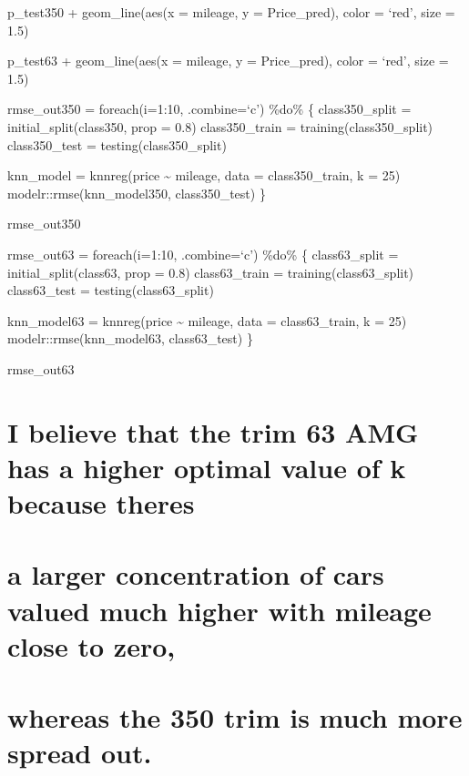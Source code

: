 \documentclass[
]{article}
\begin{document}
p\_test350 + geom\_line(aes(x = mileage, y = Price\_pred), color =
`red', size = 1.5)

p\_test63 + geom\_line(aes(x = mileage, y = Price\_pred), color = `red',
size = 1.5)

rmse\_out350 = foreach(i=1:10, .combine=`c') \%do\% \{ class350\_split =
initial\_split(class350, prop = 0.8) class350\_train =
training(class350\_split) class350\_test = testing(class350\_split)

knn\_model = knnreg(price \textasciitilde{} mileage, data =
class350\_train, k = 25) modelr::rmse(knn\_model350, class350\_test) \}

rmse\_out350

rmse\_out63 = foreach(i=1:10, .combine=`c') \%do\% \{ class63\_split =
initial\_split(class63, prop = 0.8) class63\_train =
training(class63\_split) class63\_test = testing(class63\_split)

knn\_model63 = knnreg(price \textasciitilde{} mileage, data =
class63\_train, k = 25) modelr::rmse(knn\_model63, class63\_test) \}

rmse\_out63

\hypertarget{i-believe-that-the-trim-63-amg-has-a-higher-optimal-value-of-k-because-theres}{%
\section{I believe that the trim 63 AMG has a higher optimal value of k
because
theres}\label{i-believe-that-the-trim-63-amg-has-a-higher-optimal-value-of-k-because-theres}}

\hypertarget{a-larger-concentration-of-cars-valued-much-higher-with-mileage-close-to-zero}{%
\section{a larger concentration of cars valued much higher with mileage
close to
zero,}\label{a-larger-concentration-of-cars-valued-much-higher-with-mileage-close-to-zero}}

\hypertarget{whereas-the-350-trim-is-much-more-spread-out.}{%
\section{whereas the 350 trim is much more spread
out.}\label{whereas-the-350-trim-is-much-more-spread-out.}}
\end{document}
